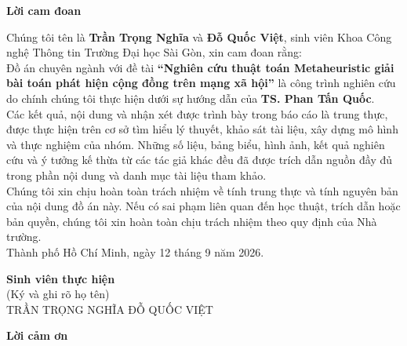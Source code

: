 \documentclass[14pt,a4paper]{extarticle}
\begin{document}


\setcounter{page}{1}

\makeatletter
\renewcommand\citepunct{], [}
\makeatother

\begin{center}
\textbf{\fontsize{20}{24}\selectfont
Lời cam đoan}
\end{center}

\noindent Chúng tôi tên là \textbf{Trần Trọng Nghĩa} và \textbf{Đỗ Quốc Việt}, sinh viên Khoa Công nghệ Thông tin Trường Đại học Sài Gòn, xin cam đoan rằng: 
\\ \noindent Đồ án chuyên ngành với đề tài \textbf{“Nghiên cứu thuật toán Metaheuristic giải bài toán phát hiện cộng đồng trên mạng xã hội”} là công trình nghiên cứu do chính chúng tôi thực hiện dưới sự hướng dẫn của \textbf{TS. Phan Tấn Quốc}.
\\ \noindent Các kết quả, nội dung và nhận xét được trình bày trong báo cáo là trung thực, được thực hiện trên cơ sở tìm hiểu lý thuyết, khảo sát tài liệu, xây dựng mô hình và thực nghiệm của nhóm. Những số liệu, bảng biểu, hình ảnh, kết quả nghiên cứu và ý tưởng kế thừa từ các tác giả khác đều đã được trích dẫn nguồn đầy đủ trong phần nội dung và danh mục tài liệu tham khảo. 
\\ \noindent Chúng tôi xin chịu hoàn toàn trách nhiệm về tính trung thực và tính nguyên bản của nội dung đồ án này. Nếu có sai phạm liên quan đến học thuật, trích dẫn hoặc bản quyền, chúng tôi xin hoàn toàn chịu trách nhiệm theo quy định của Nhà trường. 
\\ \noindent Thành phố Hồ Chí Minh, ngày 12 tháng 9 năm 2026.

\begin{flushright}
    \begin{minipage}{10cm} %
        \centering
        \textbf{Sinh viên thực hiện} \\
        (Ký và ghi rõ họ tên) \\[2cm] 
        TRẦN TRỌNG NGHĨA \hfill ĐỖ QUỐC VIỆT 
    \end{minipage}
\end{flushright}

\newpage
\begin{center}
\textbf{\fontsize{20}{24}\selectfont
Lời cảm ơn}
\end{center}
\end{document}
